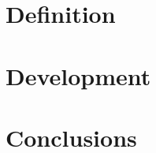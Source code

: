 \documentclass[11pt, oneside]{book}
\begin{document}
\onehalfspacing
\frontmatter





\tableofcontents

% 
\listoffigures
\listoftables

% 
\printnoidxglossaries


\mainmatter

\titleformat{\chapter}[display]
{\normalfont\bfseries}{}{0pt}{\Huge}
\titlespacing*{\chapter}{0pt}{-100pt}{0pt}

\chapter{Definition}




\chapter{Development}




\chapter{Conclusions}




\end{document}
